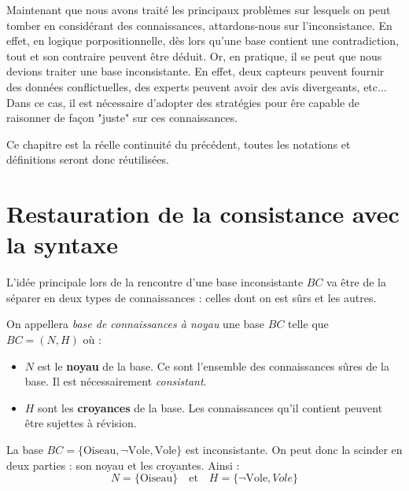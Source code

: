 \minitoc

Maintenant que nous avons traité les principaux problèmes sur lesquels 
on peut tomber en considérant des connaissances, attardons-nous sur l'inconsistance. 
En effet, en logique porpositionnelle, dès lors qu'une base contient une contradiction, 
tout et son contraire peuvent être déduit. 
Or, en pratique, il se peut que nous devions traiter une base inconsistante. En effet, deux 
capteurs peuvent fournir des données conflictuelles, des experts peuvent avoir des avis divergeants, etc... 
Dans ce cas, il est nécessaire d'adopter des stratégies pour êre capable de raisonner 
de façon "juste" sur ces connaissances. 

Ce chapitre est la réelle continuité du précédent, toutes les notations et définitions seront donc 
réutilisées. 


\section{Restauration de la consistance avec la syntaxe}

L'idée principale lors de la rencontre d'une base inconsistante $BC$ va être de la séparer 
en deux types de connaissances : celles dont on est sûrs et les autres. 

\begin{definition}
    On appellera \emph{base de connaissances à noyau} une base $BC$ telle que $ BC = (N, H)$ où :
    \begin{itemize}
        \item $N$ est le \textbf{noyau} de la base. Ce sont l'ensemble des connaissances 
        sûres de la base. Il est nécessairement \emph{consistant}. 
        \item $H$ sont les \textbf{croyances} de la base. Les connaissances qu'il contient 
        peuvent être sujettes à révision. 
    \end{itemize} 
\end{definition}

\begin{example}
    La base $BC = \{ \text{Oiseau}, \lnot \text{Vole}, \text{Vole}\}$ est inconsistante. 
    On peut donc la scinder en deux parties : son noyau et les croyantes. Ainsi : 
        $$ N = \{ \text{Oiseau} \} \quad \text{et} \quad H = \{ \lnot \text{Vole}, Vole \} $$
\end{example}

